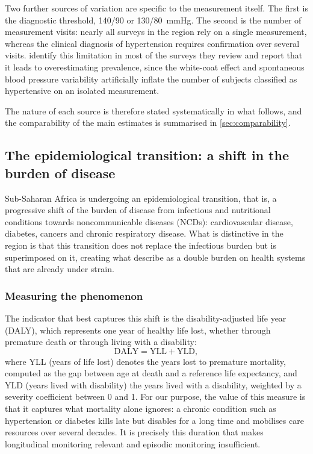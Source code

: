 \documentclass[12pt,a4paper,oneside]{report}
\begin{document}
Two further sources of variation are specific to the measurement itself. The first is the diagnostic threshold, 140/90 or 130/80~mmHg. The second is the number of measurement visits: nearly all surveys in the region rely on a single measurement, whereas the clinical diagnosis of hypertension requires confirmation over several visits. \textcite{gafane2025} identify this limitation in most of the surveys they review and report that it leads to overestimating prevalence, since the white-coat effect and spontaneous blood pressure variability artificially inflate the number of subjects classified as hypertensive on an isolated measurement.

The nature of each source is therefore stated systematically in what follows, and the comparability of the main estimates is summarised in \cref{sec:comparability}.

\subsection{The epidemiological transition: a shift in the burden of disease}\label{sec:transition}

Sub-Saharan Africa is undergoing an epidemiological transition, that is, a progressive shift of the burden of disease from infectious and nutritional conditions towards noncommunicable diseases (NCDs): cardiovascular disease, diabetes, cancers and chronic respiratory disease. What is distinctive in the region is that this transition does not replace the infectious burden but is superimposed on it, creating what \textcite{hinneh2023} describe as a double burden on health systems that are already under strain.

\subsubsection{Measuring the phenomenon}

The indicator that best captures this shift is the disability-adjusted life year (DALY), which represents one year of healthy life lost, whether through premature death or through living with a disability:
\begin{equation}
  \mathrm{DALY} = \mathrm{YLL} + \mathrm{YLD},
\end{equation}
where YLL (years of life lost) denotes the years lost to premature mortality, computed as the gap between age at death and a reference life expectancy, and YLD (years lived with disability) the years lived with a disability, weighted by a severity coefficient between 0 and 1. For our purpose, the value of this measure is that it captures what mortality alone ignores: a chronic condition such as hypertension or diabetes kills late but disables for a long time and mobilises care resources over several decades. It is precisely this duration that makes longitudinal monitoring relevant and episodic monitoring insufficient.
\end{document}
